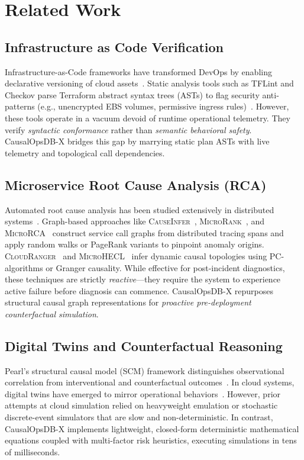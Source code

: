 \documentclass[conference]{IEEEtran}
\begin{document}
\section{Related Work}
\subsection{Infrastructure as Code Verification}
Infrastructure-as-Code frameworks have transformed DevOps by enabling declarative versioning of cloud assets~\cite{guerriero2019adoption}. Static analysis tools such as TFLint and Checkov parse Terraform abstract syntax trees (ASTs) to flag security anti-patterns (e.g., unencrypted EBS volumes, permissive ingress rules)~\cite{sharma2016drift}. However, these tools operate in a vacuum devoid of runtime operational telemetry. They verify \textit{syntactic conformance} rather than \textit{semantic behavioral safety}. CausalOpsDB-X bridges this gap by marrying static plan ASTs with live telemetry and topological call dependencies.

\subsection{Microservice Root Cause Analysis (RCA)}
Automated root cause analysis has been studied extensively in distributed systems~\cite{zhou2019fault}. Graph-based approaches like \textsc{CauseInfer}~\cite{chen2014causeinfer}, \textsc{MicroRank}~\cite{su2021microrank}, and \textsc{MicroRCA}~\cite{lin2018identifying} construct service call graphs from distributed tracing spans and apply random walks or PageRank variants to pinpoint anomaly origins. \textsc{CloudRanger}~\cite{wang2018cloudranger} and \textsc{MicroHECL}~\cite{yu2021microhecl} infer dynamic causal topologies using PC-algorithms or Granger causality. While effective for post-incident diagnostics, these techniques are strictly \textit{reactive}---they require the system to experience active failure before diagnosis can commence. CausalOpsDB-X repurposes structural causal graph representations for \textit{proactive pre-deployment counterfactual simulation}.

\subsection{Digital Twins and Counterfactual Reasoning}
Pearl's structural causal model (SCM) framework distinguishes observational correlation from interventional and counterfactual outcomes~\cite{pearl2009causality}. In cloud systems, digital twins have emerged to mirror operational behaviors~\cite{mariani2018predicting}. However, prior attempts at cloud simulation relied on heavyweight emulation or stochastic discrete-event simulators that are slow and non-deterministic. In contrast, CausalOpsDB-X implements lightweight, closed-form deterministic mathematical equations coupled with multi-factor risk heuristics, executing simulations in tens of milliseconds.
\end{document}
